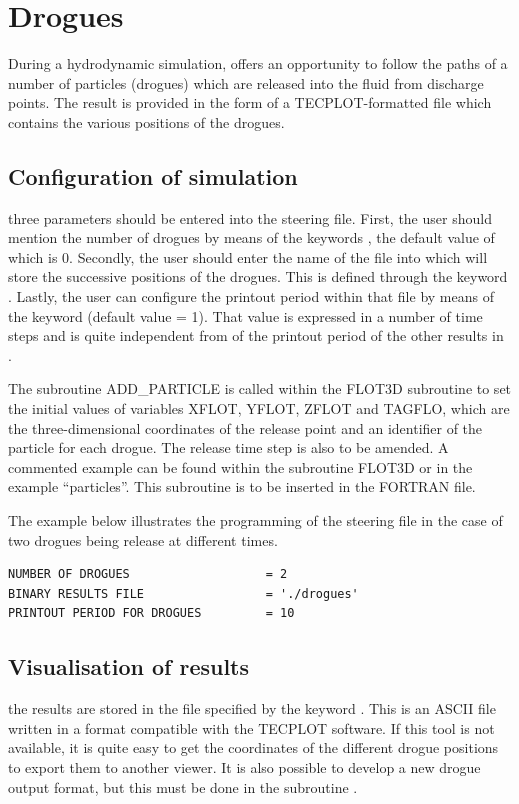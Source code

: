 \chapter{Drogues}

During a hydrodynamic simulation,  offers an opportunity to follow
the paths of a number of particles (drogues) which are released into the fluid
from discharge points. The result is provided in the form of a
TECPLOT-formatted file which contains the various positions of the drogues.


\section{Configuration of simulation}

three parameters should be entered into the steering file. First, the user
should mention the number of drogues by means of the keywords , the default value of which is 0. Secondly, the user should enter the
name of the file into which  will store the successive positions of
the drogues. This is defined through the keyword . Lastly,
the user can configure the printout period within that file by means of the
keyword  (default value = 1). That value is
expressed in a number of time steps and is quite independent from of the
printout period of the other results in .

The subroutine ADD\_PARTICLE is called within the FLOT3D subroutine to set the
initial values of variables XFLOT, YFLOT, ZFLOT and TAGFLO, which are the
three-dimensional coordinates of the release point and an identifier of the
particle for each drogue. The release time step is also to be amended. A
commented example can be found within the subroutine FLOT3D or in the example
``particles''. This subroutine is to be inserted in the FORTRAN file.

The example below illustrates the programming of the steering file in the case
of two drogues being release at different times.

\begin{lstlisting}[language=TelemacCas]
NUMBER OF DROGUES                   = 2
BINARY RESULTS FILE                 = './drogues'
PRINTOUT PERIOD FOR DROGUES         = 10
\end{lstlisting}

\section{Visualisation of results}
\label{sec:droguesfile}
the results are stored in the file specified by the keyword . This is an ASCII file written in a format compatible with
the TECPLOT software. If this tool is not available, it is quite easy to get
the coordinates of the different drogue positions to export them to another
viewer. It is also possible to develop a new drogue output format, but this
must be done in the subroutine .

